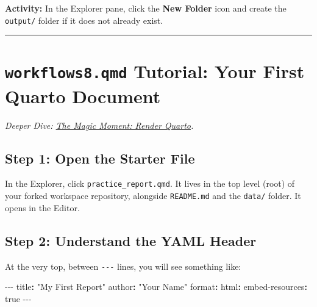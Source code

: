 \documentclass[
  letterpaper,
  DIV=11,
  numbers=noendperiod,
  oneside]{scrreprt}
\newenvironment{Shaded}{\begin{snugshade}}{\end{snugshade}}
\newcommand{\AttributeTok}[1]{\textcolor[rgb]{0.40,0.45,0.13}{#1}}
\newcommand{\CharTok}[1]{\textcolor[rgb]{0.13,0.47,0.30}{#1}}
\newcommand{\FunctionTok}[1]{\textcolor[rgb]{0.28,0.35,0.67}{#1}}
\newcommand{\KeywordTok}[1]{\textcolor[rgb]{0.00,0.23,0.31}{\textbf{#1}}}
\newcommand{\PreprocessorTok}[1]{\textcolor[rgb]{0.68,0.00,0.00}{#1}}
\newcommand{\StringTok}[1]{\textcolor[rgb]{0.13,0.47,0.30}{#1}}
\begin{document}
\textbf{Activity:} In the Explorer pane, click the \textbf{New Folder}
icon and create the \texttt{output/} folder if it does not already
exist.

\begin{center}\rule{0.5\linewidth}{0.5pt}\end{center}

\section*{\texorpdfstring{\texttt{workflows8.qmd} Tutorial: Your First
Quarto
Document}{workflows8.qmd Tutorial: Your First Quarto Document}}\label{workflows8.qmd-tutorial-your-first-quarto-document}


\emph{Deeper Dive: \href{workflows07-render-quarto.qmd}{The Magic
Moment: Render Quarto}.}

\subsection*{Step 1: Open the Starter
File}\label{step-1-open-the-starter-file}

In the Explorer, click \texttt{practice\_report.qmd}. It lives in the
top level (root) of your forked workspace repository, alongside
\texttt{README.md} and the \texttt{data/} folder. It opens in the
Editor.

\subsection*{Step 2: Understand the YAML
Header}\label{step-2-understand-the-yaml-header}

At the very top, between \texttt{-\/-\/-} lines, you will see something
like:

\begin{Shaded}
\begin{Highlighting}[numbers=left,,]
\PreprocessorTok{{-}{-}{-}}
\FunctionTok{title}\KeywordTok{:}\AttributeTok{ }\StringTok{"My First Report"}
\FunctionTok{author}\KeywordTok{:}\AttributeTok{ }\StringTok{"Your Name"}
\FunctionTok{format}\KeywordTok{:}
\AttributeTok{  }\FunctionTok{html}\KeywordTok{:}
\AttributeTok{    }\FunctionTok{embed{-}resources}\KeywordTok{:}\AttributeTok{ }\CharTok{true}
\PreprocessorTok{{-}{-}{-}}
\end{Highlighting}
\end{Shaded}
\end{document}
